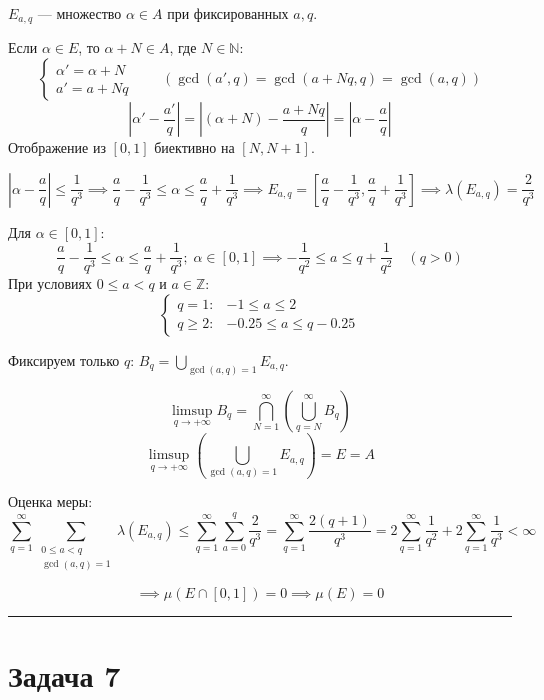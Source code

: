 \documentclass[12pt, a4paper]{article}
\begin{document}
$E_{a, q}$ --- множество $\alpha \in A$ при фиксированных $a, q$.

Если $\alpha \in E$, то $\alpha + N \in A$, где $N \in \mathbb{N}$:
\[
\begin{cases}
\alpha' = \alpha + N \\
a' = a + Nq
\end{cases}
\qquad 
\left( \gcd(a', q) = \gcd(a + Nq, q) = \gcd(a, q) \right)
\]
\[
\left| \alpha' - \frac{a'}{q} \right| = \left| (\alpha + N) - \frac{a + Nq}{q} \right| = \left| \alpha - \frac{a}{q} \right|
\]
Отображение из $[0, 1]$ биективно на $[N, N + 1]$.

\medskip

\[
\left| \alpha - \frac{a}{q} \right| \le \frac{1}{q^3} \implies \frac{a}{q} - \frac{1}{q^3} \le \alpha \le \frac{a}{q} + \frac{1}{q^3} 
\implies E_{a, q} = \left[ \frac{a}{q} - \frac{1}{q^3}, \frac{a}{q} + \frac{1}{q^3} \right] 
\implies \lambda(E_{a, q}) = \frac{2}{q^3}
\]

Для $\alpha \in [0, 1]$:
\[
\frac{a}{q} - \frac{1}{q^3} \le \alpha \le \frac{a}{q} + \frac{1}{q^3}; \; \alpha \in [0, 1] \implies -\frac{1}{q^2} \le a \le q + \frac{1}{q^2} \quad (q > 0)
\]
При условиях $0 \le a < q$ и $a \in \mathbb{Z}$:
\[
\begin{cases}
q = 1: & -1 \le a \le 2 \\
q \ge 2: & -0.25 \le a \le q - 0.25
\end{cases}
\]

Фиксируем только $q$: $B_q = \displaystyle\bigcup_{\gcd(a, q) = 1} E_{a, q}$.

\[
\limsup_{q \to +\infty} B_q = \bigcap_{N=1}^{\infty} \left( \bigcup_{q=N}^{\infty} B_q \right)
\]
\[
\limsup_{q \to +\infty} \left( \bigcup_{\gcd(a, q) = 1} E_{a, q} \right) = E = A
\]

Оценка меры:
\[
\sum_{q=1}^{\infty} \sum_{\substack{0 \le a < q \\ \gcd(a, q) = 1}} \lambda(E_{a, q}) 
\le \sum_{q=1}^{\infty} \sum_{a=0}^{q} \frac{2}{q^3} 
= \sum_{q=1}^{\infty} \frac{2(q+1)}{q^3} 
= 2 \sum_{q=1}^{\infty} \frac{1}{q^2} + 2 \sum_{q=1}^{\infty} \frac{1}{q^3} < \infty
\]

\[
\implies \mu(E \cap [0, 1]) = 0 \implies \mu(E) = 0
\]

\bigskip
\hrule
\bigskip

\section*{Задача 7}
\end{document}
